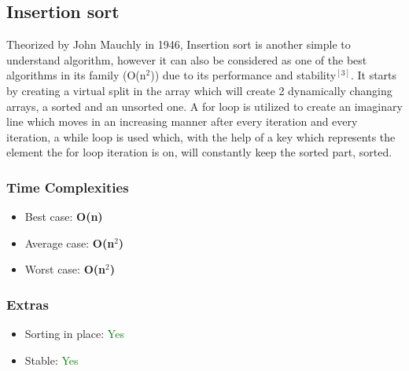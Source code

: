 \documentclass{article}
\begin{document}
\begin{multicols}{2}
\begin{comment}
\subsubsection{Sample Code}
\texttt{[image: bubble.png]}
\end{comment}


\subsection{Insertion sort}
Theorized by John Mauchly in 1946, Insertion sort is another simple to understand algorithm, however it can also be considered as one of the best algorithms in its family (O(n$^2$)) due to its performance and stability$^{[3]}$. It starts by creating a virtual split in the array which will create 2 dynamically changing arrays, a sorted and an unsorted one. A for loop is utilized to create an imaginary line which moves in an increasing manner after every iteration and every iteration, a while loop is used which, with the help of a key which represents the element the for loop iteration is on, will constantly keep the sorted part, sorted.
\subsubsection{Time Complexities}
\begin{itemize}
    \item Best case: \textbf{O(n)}
    \item Average case: \textbf{O(n$^2$)}
    \item Worst case: \textbf{O(n$^2$)}
\end{itemize}

\subsubsection{Extras}
\begin{itemize}
    \item Sorting in place: \textcolor{green}{Yes}
    \item Stable: \textcolor{green}{Yes}
\end{itemize}

\begin{comment}
\subsubsection{Sample Code}
\texttt{[image: insertion.png]}
\end{comment}


\end{multicols}
\end{document}
